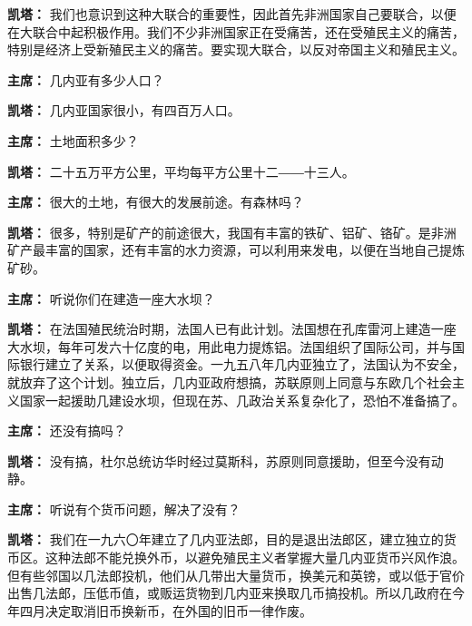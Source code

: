 \begin{duihua}
\item[\textbf{凯塔：}] 我们也意识到这种大联合的重要性，因此首先非洲国家自己要联合，以便在大联合中起积极作用。我们不少非洲国家正在受痛苦，还在受殖民主义的痛苦，特别是经济上受新殖民主义的痛苦。要实现大联合，以反对帝国主义和殖民主义。

\item[\textbf{主席：}] 几内亚有多少人口？

\item[\textbf{凯塔：}] 几内亚国家很小，有四百万人口。

\item[\textbf{主席：}] 土地面积多少？

\item[\textbf{凯塔：}] 二十五万平方公里，平均每平方公里十二――十三人。

\item[\textbf{主席：}] 很大的土地，有很大的发展前途。有森林吗？

\item[\textbf{凯塔：}] 很多，特别是矿产的前途很大，我国有丰富的铁矿、铝矿、铬矿。是非洲矿产最丰富的国家，还有丰富的水力资源，可以利用来发电，以便在当地自己提炼矿砂。

\item[\textbf{主席：}] 听说你们在建造一座大水坝？

\item[\textbf{凯塔：}] 在法国殖民统治时期，法国人已有此计划。法国想在孔库雷河上建造一座大水坝，每年可发六十亿度的电，用此电力提炼铝。法国组织了国际公司，并与国际银行建立了关系，以便取得资金。一九五八年几内亚独立了，法国认为不安全，就放弃了这个计划。独立后，几内亚政府想搞，苏联原则上同意与东欧几个社会主义国家一起援助几建设水坝，但现在苏、几政治关系复杂化了，恐怕不准备搞了。

\item[\textbf{主席：}] 还没有搞吗？

\item[\textbf{凯塔：}] 没有搞，杜尔总统访华时经过莫斯科，苏原则同意援助，但至今没有动静。

\item[\textbf{主席：}] 听说有个货币问题，解决了没有？

\item[\textbf{凯塔：}] 我们在一九六〇年建立了几内亚法郎，目的是退出法郎区，建立独立的货币区。这种法郎不能兑换外币，以避免殖民主义者掌握大量几内亚货币兴风作浪。但有些邻国以几法郎投机，他们从几带出大量货币，换美元和英镑，或以低于官价出售几法郎，压低币值，或贩运货物到几内亚来换取几币搞投机。所以几政府在今年四月决定取消旧币换新币，在外国的旧币一律作废。


\end{duihua}
